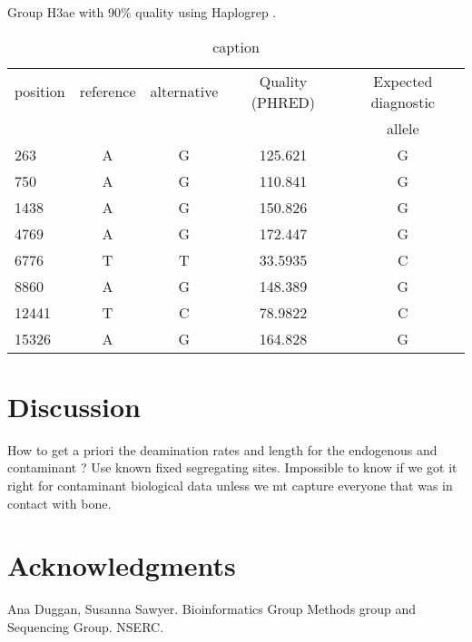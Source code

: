 \documentclass[a4paper,12pt]{article}
\begin{document}
Group H3ae with 90\% quality using Haplogrep \cite{kloss2011haplogrep}.



\begin{table}[H]
\caption{caption}
\centering
\begin{tabular}{l|cccc}
position & reference & alternative & Quality (PHRED) & Expected diagnostic \\
         &           &             &                 &  allele \\
\hline
263 & A & G & 125.621 & G \\ 
750 & A & G & 110.841 & G \\ 
1438 & A & G & 150.826 & G \\ 
4769 & A & G & 172.447 & G \\ 
6776 & T & T & 33.5935 & C \\ 
8860 & A & G & 148.389 & G \\ 
12441 & T & C & 78.9822 & C \\ 
15326 & A & G & 164.828 & G \\ 
\hline
\end{tabular}
\label{tab:diagpos}
\end{table}

\clearpage

\section{Discussion}

How to get a priori the deamination rates and length for the endogenous and contaminant ? Use known fixed segregating sites. 
Impossible to know if we got it right for contaminant biological data unless we mt capture everyone that was in contact with bone.

\section{Acknowledgments}

Ana Duggan, Susanna Sawyer. Bioinformatics Group Methods group and Sequencing Group. NSERC.

{}

\end{document}
